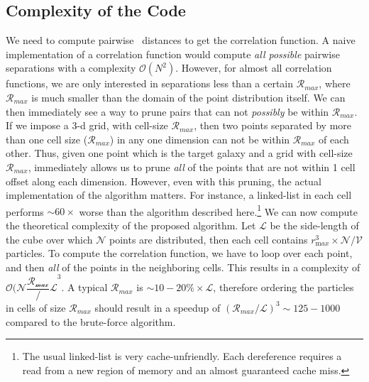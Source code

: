 \documentclass[preprint, 12pt, authoryear]{elsarticle}
\newcommand{\rmax}{\ensuremath{{{\mathcal{R}}_{max}}}\xspace}
\begin{document}
\subsection{Complexity of the Code}
We need to compute pairwise~\citep{} distances to get the correlation function. A naive implementation of a correlation function would compute {\em all possible} 
pairwise separations with a complexity $\mathcal{O}(N^2)$. However, for almost all correlation functions, we are only interested in separations less than 
a certain \rmax, where \rmax is much smaller than the domain of the point distribution itself. We can then immediately see a way to prune pairs that can not
{\em possibly} be within \rmax. If we impose a 3-d grid, with cell-size \rmax, then two points separated by more than one cell size (\rmax) in any one 
dimension can not be within \rmax of each other. Thus, given one point which is the target galaxy and a grid with cell-size \rmax, 
immediately allows us to prune {\em all} of the points that are not within 1 cell offset along each dimension. However, even with this pruning, the actual 
implementation of the algorithm matters. For instance, a linked-list in each cell performs $\sim 60\times$ worse than the algorithm described here.\footnote{The 
usual linked-list is very cache-unfriendly. Each dereference requires a read
from a new region of memory and an almost guaranteed cache miss. } 
We can now compute the theoretical complexity of the proposed algorithm. Let
$\mathcal{L}$ be the side-length of the cube over which $\mathcal{N}$ points are distributed, then
each cell contains $r_{\mathrm max}^3\times \mathcal{N/V}$ particles. To compute the
correlation function, we have to loop over each point, and then {\em all} of
the points in the neighboring cells. This results in a complexity of 
$\mathcal{O(N{\dfrac{\rmax}/L}^3}$. A typical \rmax is $\sim 10-20\% \times
\mathcal{L}$, therefore ordering the particles in cells of size \rmax should
result in a speedup of $(\rmax/\mathcal{L})^3 \sim 125-1000$ compared to the
brute-force algorithm. 
\end{document}
